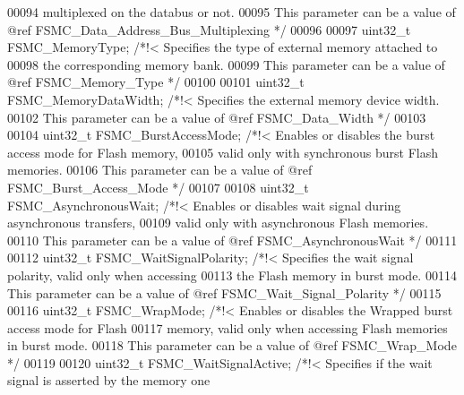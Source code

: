 \begin{DoxyCode}
00094 \textcolor{comment}{                                          multiplexed on the databus or not. }
00095 \textcolor{comment}{                                          This parameter can be a value of @ref
       FSMC\_Data\_Address\_Bus\_Multiplexing */}
00096 
00097   uint32\_t FSMC_MemoryType;          \textcolor{comment}{/*!< Specifies the type of external memory attached to}
00098 \textcolor{comment}{                                          the corresponding memory bank.}
00099 \textcolor{comment}{                                          This parameter can be a value of @ref FSMC\_Memory\_Type */}
00100 
00101   uint32\_t FSMC_MemoryDataWidth;     \textcolor{comment}{/*!< Specifies the external memory device width.}
00102 \textcolor{comment}{                                          This parameter can be a value of @ref FSMC\_Data\_Width */}
00103 
00104   uint32\_t FSMC_BurstAccessMode;     \textcolor{comment}{/*!< Enables or disables the burst access mode for Flash memory,}
00105 \textcolor{comment}{                                          valid only with synchronous burst Flash memories.}
00106 \textcolor{comment}{                                          This parameter can be a value of @ref FSMC\_Burst\_Access\_Mode
       */}
00107 
00108   uint32\_t FSMC_AsynchronousWait;     \textcolor{comment}{/*!< Enables or disables wait signal during asynchronous
       transfers,}
00109 \textcolor{comment}{                                          valid only with asynchronous Flash memories.}
00110 \textcolor{comment}{                                          This parameter can be a value of @ref FSMC\_AsynchronousWait
       */}
00111 
00112   uint32\_t FSMC_WaitSignalPolarity;  \textcolor{comment}{/*!< Specifies the wait signal polarity, valid only when
       accessing}
00113 \textcolor{comment}{                                          the Flash memory in burst mode.}
00114 \textcolor{comment}{                                          This parameter can be a value of @ref
       FSMC\_Wait\_Signal\_Polarity */}
00115 
00116   uint32\_t FSMC_WrapMode;            \textcolor{comment}{/*!< Enables or disables the Wrapped burst access mode for Flash}
00117 \textcolor{comment}{                                          memory, valid only when accessing Flash memories in burst
       mode.}
00118 \textcolor{comment}{                                          This parameter can be a value of @ref FSMC\_Wrap\_Mode */}
00119 
00120   uint32\_t FSMC_WaitSignalActive;    \textcolor{comment}{/*!< Specifies if the wait signal is asserted by the memory one}

\end{DoxyCode}
